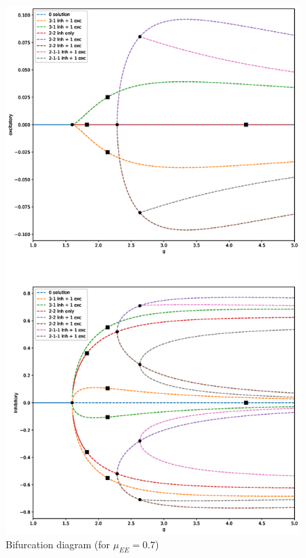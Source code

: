 \documentclass[11pt,reqno]{amsart}
\begin{document}
% 
 
 
\begin{figure}[H]
    \centering
    \includegraphics[width=12cm]{images/BDsingle20_E07.eps}
    \caption{Bifurcation diagram (for $\mu_{EE} = 0.7$)}
    \label{fig:20nocluster}
\end{figure}
\end{document}
